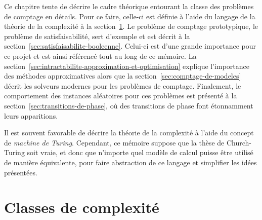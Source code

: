Ce chapitre tente de décrire le cadre théorique entourant la classe des problèmes de comptage en détails. Pour ce faire, celle-ci est définie à l'aide du langage de la théorie de la complexité à la section~\ref{sec:classes-de-complexite}. Le problème de comptage prototypique, le problème de satisfaisabilité, sert d'exemple et est décrit à la section~\ref{sec:satisfaisabilite-booleenne}. Celui-ci est d'une grande importance pour ce projet et est ainsi référencé tout au long de ce mémoire. La section~\ref{sec:intractabilite-approximation-et-optimisation} explique l'importance des méthodes approximatives alors que la section~\ref{sec:comptage-de-modeles} décrit les solveurs modernes pour les problèmes de comptage. Finalement, le comportement des instances aléatoires pour ces problèmes est présenté à la section~\ref{sec:transitions-de-phase}, où des transitions de phase font étonnamment leurs apparitions.

Il est souvent favorable de décrire la théorie de la complexité à l'aide du concept de \textit{machine de Turing}. Cependant, ce mémoire suppose que la thèse de Church-Turing soit vraie, et donc que n'importe quel modèle de calcul puisse être utilisé de manière équivalente, pour faire abstraction de ce langage et simplifier les idées présentées.


\section{Classes de complexité}
\label{sec:classes-de-complexite}

